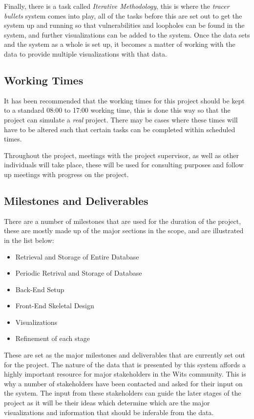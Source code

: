 \documentclass[12pt,onecolumn]{IEEEtran}
\begin{document}
Finally, there is a task called \textit{Iterative Methodology}, this is where the \textit{tracer bullets} system comes into play, all of the tasks before this are set out to get the system up and running so that vulnerabilities and loopholes can be found in the system, and further visualizations can be added to the system. Once the data sets and the system as a whole is set up, it becomes a matter of working with the data to provide multiple visualizations with that data.

\subsection{Working Times} \label{sec:WorkingTimes}
It has been recommended that the working times for this project should be kept to a standard 08:00 to 17:00 working time, this is done this way so that the project can simulate a \textit{real} project. 
There may be cases where these times will have to be altered such that certain tasks can be completed within scheduled times.

Throughout the project, meetings with the project supervisor, as well as other individuals will take place, these will be used for consulting purposes and follow up meetings with progress on the project.


\subsection{Milestones and Deliverables} \label{sec:MilestonesAndDeliverables}
There are a number of milestones that are used for the duration of the project, these are mostly made up of the major sections in the scope, and are illustrated in the list below:

\begin{itemize}
    \item Retrieval and Storage of Entire Database
    \item Periodic Retrival and Storage of Database
    \item Back-End Setup
    \item Front-End Skeletal Design
    \item Visualizations
    \item Refinement of each stage
\end{itemize}

These are set as the major milestones and deliverables that are currently set out for the project. The nature of the data that is presented by this system affords a highly important resource for major stakeholders in the Wits community. This is why a number of stakeholders have been contacted and asked for their input on the system. 
The input from these stakeholders can guide the later stages of the project as it will be their ideas which determine which are the major visualizations and information that should be inferable from the data.
\end{document}

